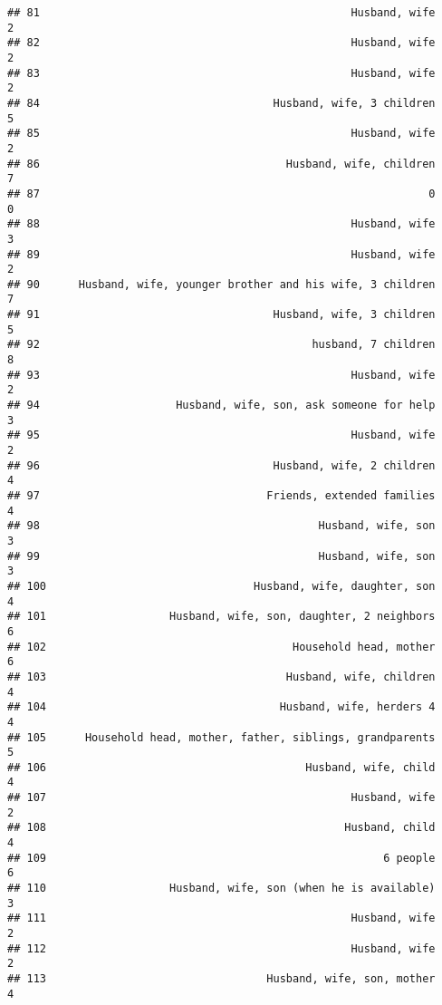 \documentclass[
]{article}
\begin{document}
\begin{verbatim}
## 81                                                Husband, wife             2
## 82                                                Husband, wife             2
## 83                                                Husband, wife             2
## 84                                    Husband, wife, 3 children             5
## 85                                                Husband, wife             2
## 86                                      Husband, wife, children             7
## 87                                                            0             0
## 88                                                Husband, wife             3
## 89                                                Husband, wife             2
## 90      Husband, wife, younger brother and his wife, 3 children             7
## 91                                    Husband, wife, 3 children             5
## 92                                          husband, 7 children             8
## 93                                                Husband, wife             2
## 94                     Husband, wife, son, ask someone for help             3
## 95                                                Husband, wife             2
## 96                                    Husband, wife, 2 children             4
## 97                                   Friends, extended families             4
## 98                                           Husband, wife, son             3
## 99                                           Husband, wife, son             3
## 100                                Husband, wife, daughter, son             4
## 101                   Husband, wife, son, daughter, 2 neighbors             6
## 102                                      Household head, mother             6
## 103                                     Husband, wife, children             4
## 104                                    Husband, wife, herders 4             4
## 105      Household head, mother, father, siblings, grandparents             5
## 106                                        Husband, wife, child             4
## 107                                               Husband, wife             2
## 108                                              Husband, child             4
## 109                                                    6 people             6
## 110                   Husband, wife, son (when he is available)             3
## 111                                               Husband, wife             2
## 112                                               Husband, wife             2
## 113                                  Husband, wife, son, mother             4

\end{verbatim}
\end{document}
